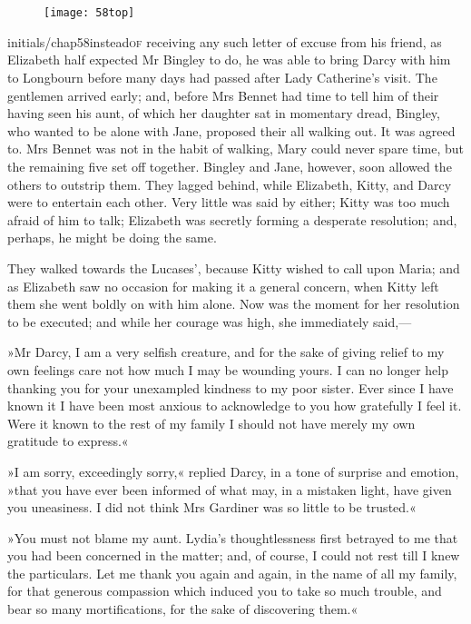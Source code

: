 \chapter[Chapter \thechapter]{}
	
	
\begin{figure}[t!]
\centering
\texttt{[image: 58top]}
\end{figure}


\lettrine[lines=6,image=true,findent=2pt]{initials/chap58instead}{of} receiving any such letter of excuse from his friend, as Elizabeth half expected Mr Bingley to do, he was able to bring Darcy with him to Longbourn before many days had passed after Lady Catherine's visit. The gentlemen arrived early; and, before Mrs Bennet had time to tell him of their having seen his aunt, of which her daughter sat in momentary dread, Bingley, who wanted to be alone with Jane, proposed their all walking out. It was agreed to. Mrs Bennet was not in the habit of walking, Mary could never spare time, but the remaining five set off together. Bingley and Jane, however, soon allowed the others to outstrip them. They lagged behind, while Elizabeth, Kitty, and Darcy were to entertain each other. Very little was said by either; Kitty was too much afraid of him to talk; Elizabeth was secretly forming a desperate resolution; and, perhaps, he might be doing the same.

They walked towards the Lucases', because Kitty wished to call upon Maria; and as Elizabeth saw no occasion for making it a general concern, when Kitty left them she went boldly on with him alone. Now was the moment for her resolution to be executed; and while her courage was high, she immediately said,—

»Mr Darcy, I am a very selfish creature, and for the sake of giving relief to my own feelings care not how much I may be wounding yours. I can no longer help thanking you for your unexampled kindness to my poor sister. Ever since I have known it I have been most anxious to acknowledge to you how gratefully I feel it. Were it known to the rest of my family I should not have merely my own gratitude to express.«

»I am sorry, exceedingly sorry,« replied Darcy, in a tone of surprise and emotion, »that you have ever been informed of what may, in a mistaken light, have given you uneasiness. I did not think Mrs Gardiner was so little to be trusted.«

»You must not blame my aunt. Lydia's thoughtlessness first betrayed to me that you had been concerned in the matter; and, of course, I could not rest till I knew the particulars. Let me thank you again and again, in the name of all my family, for that generous compassion which induced you to take so much trouble, and bear so many mortifications, for the sake of discovering them.«

